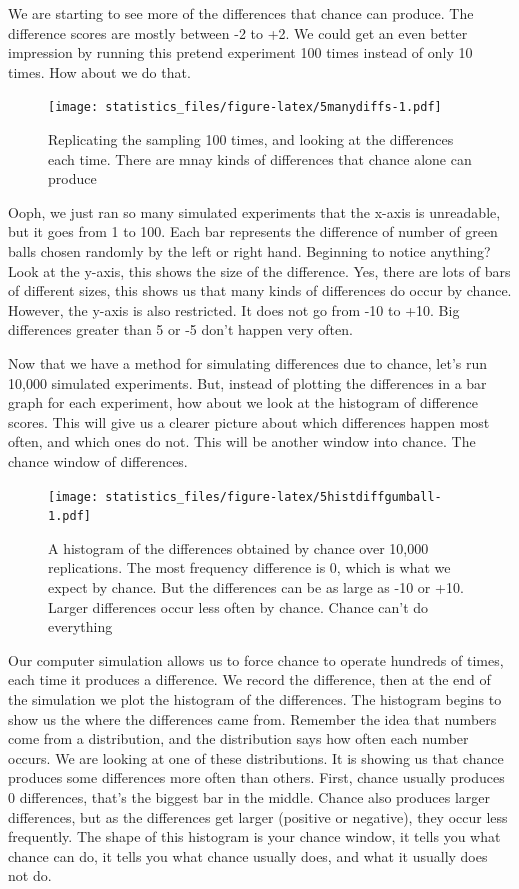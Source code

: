 \documentclass[]{book}
\begin{document}
We are starting to see more of the differences that chance can produce. The difference scores are mostly between -2 to +2. We could get an even better impression by running this pretend experiment 100 times instead of only 10 times. How about we do that.

\begin{figure}
\centering
\texttt{[image: statistics\_files/figure-latex/5manydiffs-1.pdf]}
\caption{\label{fig:5manydiffs}Replicating the sampling 100 times, and looking at the differences each time. There are mnay kinds of differences that chance alone can produce}
\end{figure}

Ooph, we just ran so many simulated experiments that the x-axis is unreadable, but it goes from 1 to 100. Each bar represents the difference of number of green balls chosen randomly by the left or right hand. Beginning to notice anything? Look at the y-axis, this shows the size of the difference. Yes, there are lots of bars of different sizes, this shows us that many kinds of differences do occur by chance. However, the y-axis is also restricted. It does not go from -10 to +10. Big differences greater than 5 or -5 don't happen very often.

Now that we have a method for simulating differences due to chance, let's run 10,000 simulated experiments. But, instead of plotting the differences in a bar graph for each experiment, how about we look at the histogram of difference scores. This will give us a clearer picture about which differences happen most often, and which ones do not. This will be another window into chance. The chance window of differences.

\begin{figure}
\centering
\texttt{[image: statistics\_files/figure-latex/5histdiffgumball-1.pdf]}
\caption{\label{fig:5histdiffgumball}A histogram of the differences obtained by chance over 10,000 replications. The most frequency difference is 0, which is what we expect by chance. But the differences can be as large as -10 or +10. Larger differences occur less often by chance. Chance can't do everything}
\end{figure}

Our computer simulation allows us to force chance to operate hundreds of times, each time it produces a difference. We record the difference, then at the end of the simulation we plot the histogram of the differences. The histogram begins to show us the where the differences came from. Remember the idea that numbers come from a distribution, and the distribution says how often each number occurs. We are looking at one of these distributions. It is showing us that chance produces some differences more often than others. First, chance usually produces 0 differences, that's the biggest bar in the middle. Chance also produces larger differences, but as the differences get larger (positive or negative), they occur less frequently. The shape of this histogram is your chance window, it tells you what chance can do, it tells you what chance usually does, and what it usually does not do.
\end{document}

